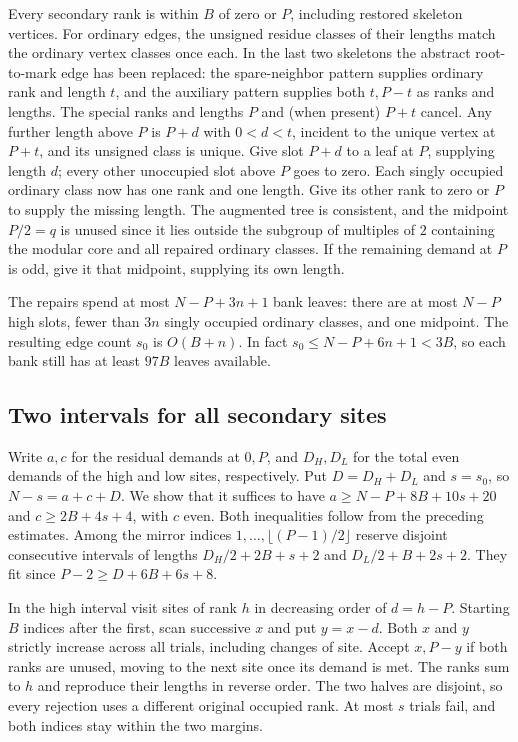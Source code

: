 Every secondary rank is within $B$ of zero or $P$, including restored
skeleton vertices. For ordinary edges, the unsigned residue classes of
their lengths match the ordinary vertex classes once each. In the last
two skeletons the abstract root-to-mark edge has been replaced: the
spare-neighbor pattern supplies ordinary rank and length $t$, and the
auxiliary pattern supplies both $t,P-t$ as ranks and lengths.
The special ranks and lengths $P$ and (when present) $P+t$ cancel.
Any further length above $P$ is $P+d$ with $0<d<t$, incident to the
unique vertex at $P+t$, and its unsigned class is unique. Give slot
$P+d$ to a leaf at $P$, supplying length $d$; every other unoccupied
slot above $P$ goes to zero. Each singly occupied ordinary class now
has one rank and one length. Give its other rank to zero or $P$ to
supply the missing length. The augmented tree is consistent, and
the midpoint $P/2=q$ is unused since it lies outside the subgroup of multiples of $2$ containing the modular core and all repaired ordinary classes. If the remaining demand at
$P$ is odd, give it that midpoint, supplying its own length.

The repairs spend at most $N-P+3n+1$ bank leaves: there are at most
$N-P$ high slots, fewer than $3n$ singly occupied ordinary classes,
and one midpoint. The resulting edge count $s_0$ is $O(B+n)$.
In fact $s_0\le N-P+6n+1<3B$, so each bank still has at least
$97B$ leaves available.

\subsection{Two intervals for all secondary sites}
Write $a,c$ for the residual demands at $0,P$, and $D_H,D_L$ for
the total even demands of the high and low sites, respectively.
Put $D=D_H+D_L$ and $s=s_0$, so $N-s=a+c+D$. We show that it
suffices to have $a\ge N-P+8B+10s+20$ and $c\ge2B+4s+4$, with $c$
even. Both inequalities follow from the preceding estimates.
Among the mirror indices $1,\ldots,\lfloor(P-1)/2\rfloor$ reserve
disjoint consecutive intervals of lengths $D_H/2+2B+s+2$ and
$D_L/2+B+2s+2$. They fit since $P-2\ge D+6B+6s+8$.

In the high interval visit sites of rank $h$ in decreasing order of
$d=h-P$. Starting $B$ indices after the first, scan successive $x$
and put $y=x-d$. Both $x$ and $y$ strictly increase across all trials,
including changes of site. Accept $x,P-y$ if both ranks are unused,
moving to the next site once its demand is met. The ranks sum to $h$
and reproduce their lengths in reverse order. The two halves are
disjoint, so every rejection uses a different original occupied rank.
At most $s$ trials fail, and both indices stay within the two margins.

